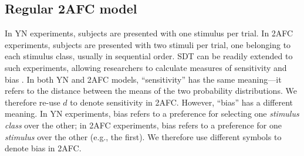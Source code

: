 \documentclass[man]{apa6}
\begin{document}
\subsection{Regular 2AFC model}
In YN experiments, subjects are presented with one stimulus per trial. In 2AFC experiments, subjects are presented with two stimuli per trial, one belonging to each stimulus class, usually in sequential order. SDT can be readily extended to such experiments, allowing researchers to calculate measures of sensitivity and bias  \parencite[e.g.,][]{decarloon2012}. In both YN and 2AFC models, ``sensitivity'' has the same meaning---it refers to the distance between the means of the two probability distributions. We therefore re-use $d$ to denote sensitivity in 2AFC. However, ``bias'' has a different meaning. In YN experiments, bias refers to a preference for selecting one \emph{stimulus class} over the other; in 2AFC experiments, bias refers to a preference for one \emph{stimulus} over the other (e.g., the first). We therefore use different symbols to denote bias in 2AFC.
\end{document}
